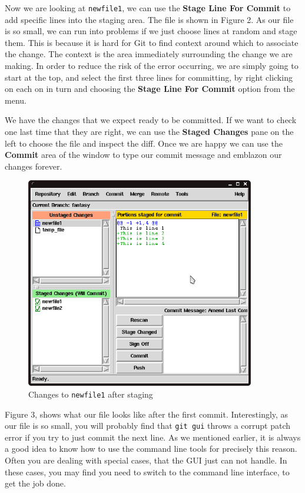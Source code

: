 Now we are looking at \texttt{newfile1}, we can use the \textbf{Stage Line For Commit} to add specific lines into the staging area.  The file is shown in Figure 2.  As our file is so small, we can run into problems if we just choose lines at random and stage them.  This is because it is hard for Git to find context around which to associate the change.  The context is the area immediately surrounding the change we are making.  In order to reduce the risk of the error occurring, we are simply going to start at the top, and select the first three lines for committing, by right clicking on each on in turn and choosing the \textbf{Stage Line For Commit} option from the menu.

We have the changes that we expect ready to be committed.  If we want to check one last time that they are right, we can use the \textbf{Staged Changes} pane on the left to choose the file and inspect the diff.  Once we are happy we can use the \textbf{Commit} area of the window to type our commit message and emblazon our changes forever.

\begin{figure}[hbt]
\centering
\includegraphics[width=10cm]{images/f-af5-d3.png}
\caption{Changes to \texttt{newfile1} after staging}
\end{figure} 

Figure 3, shows what our file looks like after the first commit.  Interestingly, as our file is so small, you will probably find that \texttt{git gui} throws a corrupt patch error if you try to just commit the next line.  As we mentioned earlier, it is always a good idea to know how to use the command line tools for precisely this reason.  Often you are dealing with special cases, that the GUI just can not handle.  In these cases, you may find you need to switch to the command line interface, to get the job done.

